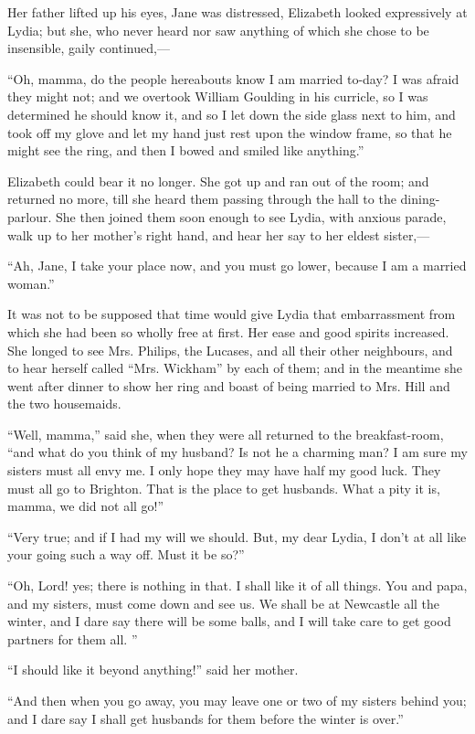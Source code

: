 \documentclass[10pt]{book}
\begin{document}
   Her father lifted up his eyes, Jane was distressed, Elizabeth looked
expressively at Lydia; but she, who never heard nor saw anything of
which she chose to be insensible, gaily continued,—
  

   “Oh, mamma, do the people hereabouts know I am married to-day? I was
afraid they might not; and we overtook William Goulding in his curricle,
so I was determined he should know it, and so I let down the side glass
next to him, and took off my glove and let my hand just rest upon the
window frame, so that he
   might see the ring, and then I bowed and
smiled like anything.”
  

   Elizabeth could bear it no longer. She got up and ran out of the room;
and returned no more, till she heard them passing through the hall to
the dining-parlour. She then joined them soon enough to see Lydia, with
anxious parade, walk up to her mother’s right hand, and hear her say to
her eldest sister,—
  

   “Ah, Jane, I take your place now, and you must go lower, because I am a
married woman.”
  

   It was not to be supposed that time would give Lydia that embarrassment
from which she had been so wholly free at first. Her ease and good
spirits increased. She longed to see Mrs. Philips, the Lucases, and all
their other neighbours, and to hear herself called “Mrs. Wickham” by
each of them; and in the meantime she went after dinner to show her ring
and boast of being married to Mrs. Hill and the two housemaids.
  

   “Well, mamma,” said she, when they were all returned to the
breakfast-room, “and what do you think of my husband? Is not he a
charming man? I am sure my sisters must all envy me. I only hope they
may have half my good luck. They must all go to Brighton. That is the
place to get husbands. What a pity it is, mamma, we did not all go!”
  

   “Very true; and if I had my will we should. But, my dear Lydia, I don’t
at all like your going such a way off. Must it be so?”
  

   “Oh, Lord! yes; there is nothing in that. I shall like it of all things.
You and papa, and my sisters, must come down and see us. We shall be at
Newcastle all the winter, and I dare say there will be some balls, and I
will take care to get good partners for them all.
   ”
  

   “I should like it beyond anything!” said her mother.
  

   “And then when you go away, you may leave one or two of my sisters
behind you; and I dare say I shall get husbands for them before the
winter is over.”
  
\end{document}
